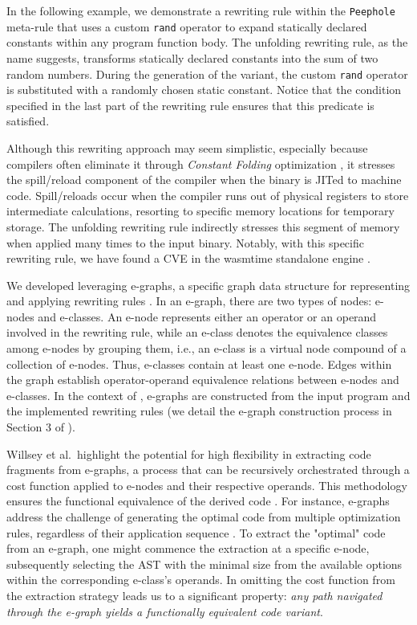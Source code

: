 In the following example, we demonstrate a rewriting rule within the \texttt{Peephole} meta-rule that uses a custom \texttt{rand} operator to expand statically declared constants within any \Wasm program function body. 
The unfolding rewriting rule, as the name suggests, transforms statically declared constants into the sum of two random numbers.
During the generation of the \Wasm variant, the custom \texttt{rand} operator is substituted with a randomly chosen static constant.
Notice that the condition specified in the last part of the rewriting rule ensures that this predicate is satisfied. 




Although this rewriting approach may seem simplistic, especially because compilers often eliminate it through \emph{Constant Folding} optimization \cite{2023arXiv230513241T}, it stresses the spill/reload component of the compiler when the \Wasm binary is JITed to machine code.
Spill/reloads occur when the compiler runs out of physical registers to store intermediate calculations, resorting to specific memory locations for temporary storage. 
The unfolding rewriting rule indirectly stresses this segment of memory when applied many times to the input \Wasm binary. 
Notably, with this specific rewriting rule, we have found a CVE in the wasmtime standalone engine \cite{CVE}.




We developed \tool leveraging e-graphs, a specific graph data structure for representing and applying rewriting rules \cite{10.1145/3571207}. 
In an e-graph, there are two types of nodes: e-nodes and e-classes. 
An e-node represents either an operator or an operand involved in the rewriting rule, while an e-class denotes the equivalence classes among e-nodes by grouping them, i.e., an e-class is a virtual node compound of a collection of e-nodes. 
Thus, e-classes contain at least one e-node.
Edges within the graph establish operator-operand equivalence relations between e-nodes and e-classes.
In the context of \tool, e-graphs are constructed from the input \Wasm program and the implemented rewriting rules (we detail the e-graph construction process in Section 3 of \cite{wasmmutate}).

Willsey et al.~highlight the potential for high flexibility in extracting code fragments from e-graphs, a process that can be recursively orchestrated through a cost function applied to e-nodes and their respective operands.
This methodology ensures the functional equivalence of the derived code \cite{e-graph}. 
For instance, e-graphs address the challenge of generating the optimal code from multiple optimization rules, regardless of their application sequence \cite{10.1145/1480881.1480915}.
To extract the "optimal" code from an e-graph, one might commence the extraction at a specific e-node, subsequently selecting the AST with the minimal size from the available options within the corresponding e-class's operands.
In \too omitting the cost function from the extraction strategy leads us to a significant property: \emph{any path navigated through the e-graph yields a functionally equivalent code variant}. 

